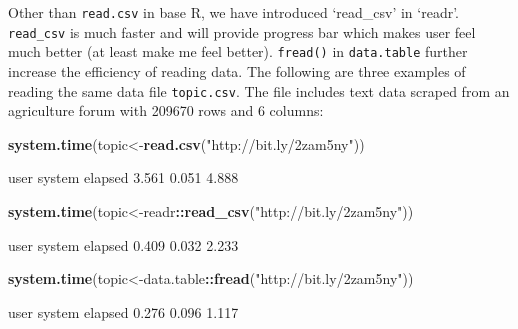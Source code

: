 \documentclass[12pt,]{krantz}
\makeatletter
\newenvironment{Shaded}{\begin{snugshade}}{\end{snugshade}}
\newcommand{\KeywordTok}[1]{\textcolor[rgb]{0.27,0.27,0.27}{\textbf{#1}}}
\newcommand{\NormalTok}[1]{#1}
\newcommand{\OperatorTok}[1]{\textcolor[rgb]{0.43,0.43,0.43}{\textbf{#1}}}
\newcommand{\StringTok}[1]{\textcolor[rgb]{0.5,0.5,0.5}{#1}}
\newenvironment{kframe}{%
\medskip{}
\setlength{\fboxsep}{.8em}
 \def\at@end@of@kframe{}%
 \ifinner\ifhmode%
  \def\at@end@of@kframe{\end{minipage}}%
  \begin{minipage}{\columnwidth}%
 \fi\fi%
 \def\FrameCommand##1{\hskip\@totalleftmargin \hskip-\fboxsep
 \colorbox{shadecolor}{##1}\hskip-\fboxsep
     \hskip-\linewidth \hskip-\@totalleftmargin \hskip\columnwidth}%
 \MakeFramed {\advance\hsize-\width
   \@totalleftmargin\z@ \linewidth\hsize
   \@setminipage}}%
 {\par\unskip\endMakeFramed%
 \at@end@of@kframe}
\renewenvironment{Shaded}{\begin{kframe}}{\end{kframe}}
\makeatother
\begin{document}
Other than \texttt{read.csv} in base R, we have introduced `read\_csv' in `readr'. \texttt{read\_csv} is much faster and will provide progress bar which makes user feel much better (at least make me feel better). \texttt{fread()} in \texttt{data.table} further increase the efficiency of reading data. The following are three examples of reading the same data file \texttt{topic.csv}. The file includes text data scraped from an agriculture forum with 209670 rows and 6 columns:

\begin{Shaded}
\begin{Highlighting}[]
\KeywordTok{system.time}\NormalTok{(topic<-}\KeywordTok{read.csv}\NormalTok{(}\StringTok{"http://bit.ly/2zam5ny"}\NormalTok{))}
\end{Highlighting}
\end{Shaded}

\begin{Shaded}
\begin{Highlighting}[]
\NormalTok{   user  system elapsed }
\NormalTok{  3.561   0.051   4.888 }
\end{Highlighting}
\end{Shaded}

\begin{Shaded}
\begin{Highlighting}[]
\KeywordTok{system.time}\NormalTok{(topic<-readr}\OperatorTok{::}\KeywordTok{read_csv}\NormalTok{(}\StringTok{"http://bit.ly/2zam5ny"}\NormalTok{))}
\end{Highlighting}
\end{Shaded}

\begin{Shaded}
\begin{Highlighting}[]
\NormalTok{   user  system elapsed }
\NormalTok{  0.409   0.032   2.233 }
\end{Highlighting}
\end{Shaded}

\begin{Shaded}
\begin{Highlighting}[]
\KeywordTok{system.time}\NormalTok{(topic<-data.table}\OperatorTok{::}\KeywordTok{fread}\NormalTok{(}\StringTok{"http://bit.ly/2zam5ny"}\NormalTok{))}
\end{Highlighting}
\end{Shaded}

\begin{Shaded}
\begin{Highlighting}[]
\NormalTok{   user  system elapsed }
\NormalTok{  0.276   0.096   1.117 }
\end{Highlighting}
\end{Shaded}
\end{document}

